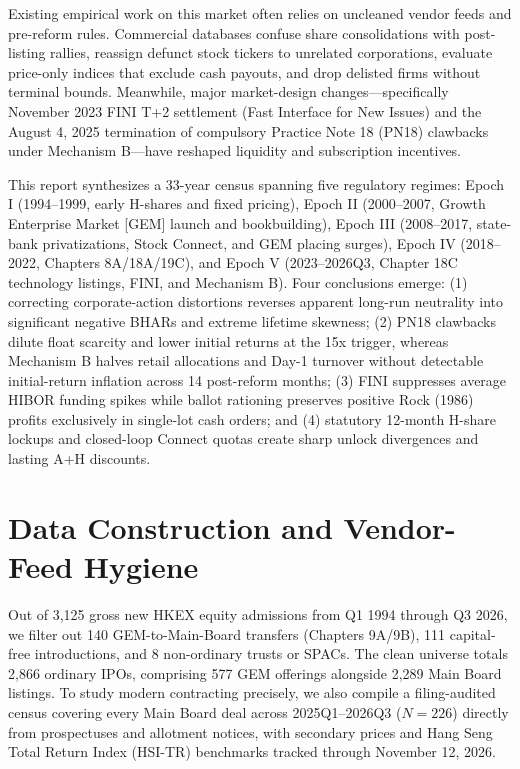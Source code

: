 \documentclass[12pt,letterpaper]{article}
\begin{document}
Existing empirical work on this market often relies on uncleaned vendor feeds and pre-reform rules. Commercial databases confuse share consolidations with post-listing rallies, reassign defunct stock tickers to unrelated corporations, evaluate price-only indices that exclude cash payouts, and drop delisted firms without terminal bounds. Meanwhile, major market-design changes---specifically November 2023 FINI T+2 settlement (Fast Interface for New Issues) and the August 4, 2025 termination of compulsory Practice Note 18 (PN18) clawbacks under Mechanism B---have reshaped liquidity and subscription incentives.

This report synthesizes a 33-year census spanning five regulatory regimes: Epoch I (1994--1999, early H-shares and fixed pricing), Epoch II (2000--2007, Growth Enterprise Market [GEM] launch and bookbuilding), Epoch III (2008--2017, state-bank privatizations, Stock Connect, and GEM placing surges), Epoch IV (2018--2022, Chapters 8A/18A/19C), and Epoch V (2023--2026Q3, Chapter 18C technology listings, FINI, and Mechanism B). Four conclusions emerge: (1) correcting corporate-action distortions reverses apparent long-run neutrality into significant negative BHARs and extreme lifetime skewness; (2) PN18 clawbacks dilute float scarcity and lower initial returns at the 15x trigger, whereas Mechanism B halves retail allocations and Day-1 turnover without detectable initial-return inflation across 14 post-reform months; (3) FINI suppresses average HIBOR funding spikes while ballot rationing preserves positive Rock (1986) profits exclusively in single-lot cash orders; and (4) statutory 12-month H-share lockups and closed-loop Connect quotas create sharp unlock divergences and lasting A+H discounts.

\section{Data Construction and Vendor-Feed Hygiene}

Out of 3,125 gross new HKEX equity admissions from Q1 1994 through Q3 2026, we filter out 140 GEM-to-Main-Board transfers (Chapters 9A/9B), 111 capital-free introductions, and 8 non-ordinary trusts or SPACs. The clean universe totals 2,866 ordinary IPOs, comprising 577 GEM offerings alongside 2,289 Main Board listings. To study modern contracting precisely, we also compile a filing-audited census covering every Main Board deal across 2025Q1--2026Q3 ($N = 226$) directly from prospectuses and allotment notices, with secondary prices and Hang Seng Total Return Index (HSI-TR) benchmarks tracked through November 12, 2026.
\end{document}
